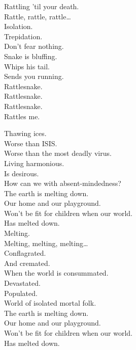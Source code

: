 Rattling 'til your death. \\

Rattle, rattle, rattle… \\

Isolation. \\
Trepidation. \\
Don't fear nothing. \\
Snake is bluffing. \\
Whips his tail. \\
Sends you running. \\

Rattlesnake. \\
Rattlesnake. \\
Rattlesnake. \\
Rattles me. \\




Thawing ices. \\
Worse than ISIS. \\
Worse than the most deadly virus. \\
Living harmonious. \\
Is desirous. \\
How can we with absent-mindedness? \\

The earth is melting down. \\
Our home and our playground. \\
Won't be fit for children when our world. \\
Has melted down. \\

Melting. \\
Melting, melting, melting… \\

Conflagrated. \\
And cremated. \\
When the world is consummated. \\
Devastated. \\
Populated. \\
World of isolated mortal folk. \\

The earth is melting down. \\
Our home and our playground. \\
Won't be fit for children when our world. \\
Has melted down. \\

